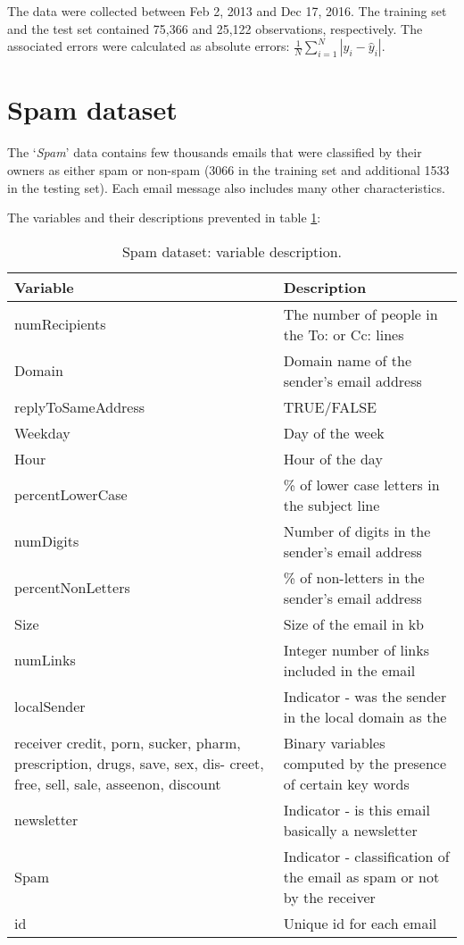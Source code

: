 \documentclass{article}
\begin{document}
The data were collected between Feb 2, 2013 and Dec 17, 2016. The training set and the test set contained 75,366 and 25,122 observations, respectively.  
The associated errors were calculated as absolute errors: $\frac{1}{N} \sum_{i=1}^{N} |y_i - \hat{y}_i|$. 






\section{Spam dataset}
The `\textit{Spam}' data contains few thousands emails that were classified by their
owners as either spam or non-spam (3066 in the training set and additional 1533 in the testing set). Each email message also includes many other characteristics.

The variables and their descriptions prevented in table \ref{tab:spam_var}:

\begin{table}[h]
	\begin{center}
		\renewcommand{\arraystretch}{1.2}
		\begin{tabular}{p{4cm} p{7.5cm}} \hline
		Variable   				& Description       \\\hline
		numRecipients		    & The number of people in the To: or Cc: lines\\
		Domain      		    & Domain name of the sender's email address\\
		replyToSameAddress      & TRUE/FALSE\\
		Weekday 				& Day of the week\\
		Hour 					& Hour of the day\\
		percentLowerCase 		& \% of lower case letters in the subject line\\
		numDigits 				& Number of digits in the sender's email address\\
		percentNonLetters 		& \% of non-letters in the sender's email address\\
		Size 					& Size of the email in kb\\
		numLinks				& Integer number of links included in the email\\
		localSender 			& Indicator - was the sender in the local domain as the\\
		receiver
		credit, porn, sucker,
		pharm, prescription,
		drugs, save, sex, dis-
		creet, free, sell, sale,
		asseenon, discount		& Binary variables computed by the presence of
		certain key words \\
		newsletter 				& Indicator - is this email basically a newsletter\\
		Spam 					& Indicator - classification of the email as spam or not by the receiver\\
		id 						& Unique id for each email \\\hline
			
		\end{tabular}
		\caption{Spam dataset: variable description.}
	\end{center}
	\label{tab:spam_var}
\end{table} 
\end{document}
